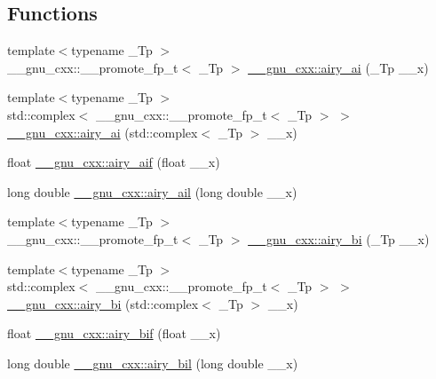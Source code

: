 \subsection*{Functions}
\begin{DoxyCompactItemize}
\item 
{\footnotesize template$<$typename \+\_\+\+Tp $>$ }\\\+\_\+\+\_\+gnu\+\_\+cxx\+::\+\_\+\+\_\+promote\+\_\+fp\+\_\+t$<$ \+\_\+\+Tp $>$ \hyperlink{group__gnu__math__spec__func_ga53243cdb83abeb008fa90d8a098768af}{\+\_\+\+\_\+gnu\+\_\+cxx\+::airy\+\_\+ai} (\+\_\+\+Tp \+\_\+\+\_\+x)
\item 
{\footnotesize template$<$typename \+\_\+\+Tp $>$ }\\std\+::complex$<$ \+\_\+\+\_\+gnu\+\_\+cxx\+::\+\_\+\+\_\+promote\+\_\+fp\+\_\+t$<$ \+\_\+\+Tp $>$ $>$ \hyperlink{group__gnu__math__spec__func_gab61dcd6c20c602711544b39d2429038b}{\+\_\+\+\_\+gnu\+\_\+cxx\+::airy\+\_\+ai} (std\+::complex$<$ \+\_\+\+Tp $>$ \+\_\+\+\_\+x)
\item 
float \hyperlink{group__gnu__math__spec__func_gaf317ba724c44b3a8271fe341d9870173}{\+\_\+\+\_\+gnu\+\_\+cxx\+::airy\+\_\+aif} (float \+\_\+\+\_\+x)
\item 
long double \hyperlink{group__gnu__math__spec__func_ga800fdb61c672ae1831f4ca4250d657de}{\+\_\+\+\_\+gnu\+\_\+cxx\+::airy\+\_\+ail} (long double \+\_\+\+\_\+x)
\item 
{\footnotesize template$<$typename \+\_\+\+Tp $>$ }\\\+\_\+\+\_\+gnu\+\_\+cxx\+::\+\_\+\+\_\+promote\+\_\+fp\+\_\+t$<$ \+\_\+\+Tp $>$ \hyperlink{group__gnu__math__spec__func_ga812ca309bff1b0ae2bbe1183a0bc47d5}{\+\_\+\+\_\+gnu\+\_\+cxx\+::airy\+\_\+bi} (\+\_\+\+Tp \+\_\+\+\_\+x)
\item 
{\footnotesize template$<$typename \+\_\+\+Tp $>$ }\\std\+::complex$<$ \+\_\+\+\_\+gnu\+\_\+cxx\+::\+\_\+\+\_\+promote\+\_\+fp\+\_\+t$<$ \+\_\+\+Tp $>$ $>$ \hyperlink{group__gnu__math__spec__func_ga6dee14118a9bc3ccfa6f1d2b96b4be10}{\+\_\+\+\_\+gnu\+\_\+cxx\+::airy\+\_\+bi} (std\+::complex$<$ \+\_\+\+Tp $>$ \+\_\+\+\_\+x)
\item 
float \hyperlink{group__gnu__math__spec__func_ga2ade465827bdba7370abbcce78e54912}{\+\_\+\+\_\+gnu\+\_\+cxx\+::airy\+\_\+bif} (float \+\_\+\+\_\+x)
\item 
long double \hyperlink{group__gnu__math__spec__func_ga59240b3f40177e5187f3f194f624f0f8}{\+\_\+\+\_\+gnu\+\_\+cxx\+::airy\+\_\+bil} (long double \+\_\+\+\_\+x)

\end{DoxyCompactItemize}
